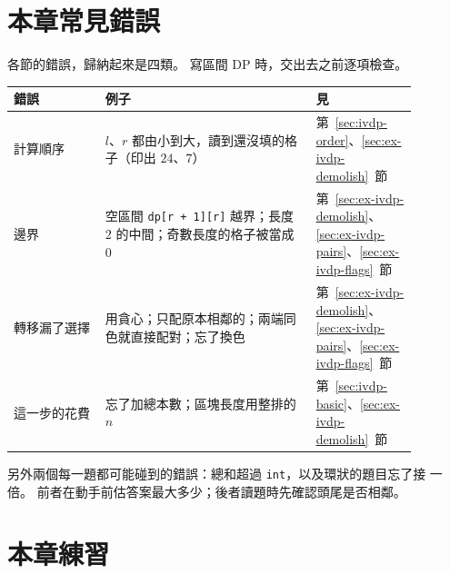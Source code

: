 \section{本章常見錯誤}
\label{sec:ivdp-pitfalls}

各節的錯誤，歸納起來是四類。 寫區間 DP 時，交出去之前逐項檢查。

\begin{center}
\begin{tabular}{p{0.2\linewidth}p{0.46\linewidth}p{0.22\linewidth}}
\toprule
錯誤 & 例子 & 見 \\
\midrule
計算順序 & $l$、$r$ 都由小到大，讀到還沒填的格子（印出 $24$、$7$） &
第~\ref{sec:ivdp-order}、\ref{sec:ex-ivdp-demolish}~節 \\
邊界 & 空區間 \texttt{dp[r + 1][r]} 越界；長度 $2$ 的中間；奇數長度的格子被當成
$0$ & 第~\ref{sec:ex-ivdp-demolish}、\ref{sec:ex-ivdp-pairs}、\ref{sec:ex-ivdp-flags}~節 \\
轉移漏了選擇 & 用貪心；只配原本相鄰的；兩端同色就直接配對；忘了換色 &
第~\ref{sec:ex-ivdp-demolish}、\ref{sec:ex-ivdp-pairs}、\ref{sec:ex-ivdp-flags}~節 \\
這一步的花費 & 忘了加總本數；區塊長度用整排的 $n$ & 第~\ref{sec:ivdp-basic}、\ref{sec:ex-ivdp-demolish}~節 \\
\bottomrule
\end{tabular}
\end{center}

另外兩個每一題都可能碰到的錯誤：總和超過 \texttt{int}，以及環狀的題目忘了接
一倍。 前者在動手前估答案最大多少；後者讀題時先確認頭尾是否相鄰。

\section{本章練習}
\label{sec:ivdp-exercises}

